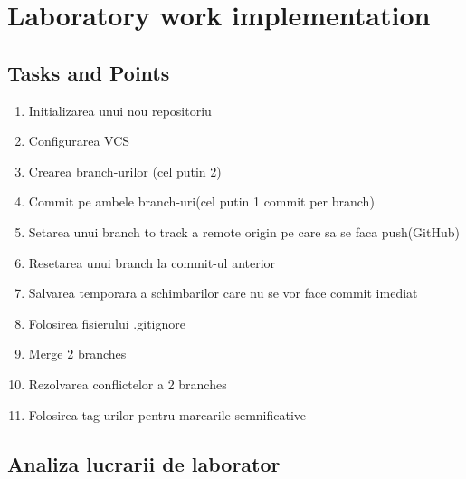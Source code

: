 \section{Laboratory work implementation}

\subsection{Tasks and Points}

\begin{enumerate}

	\item  Initializarea unui nou repositoriu
	\item  Configurarea VCS
	\item  Crearea branch-urilor (cel putin 2)
	\item  Commit pe ambele branch-uri(cel putin 1 commit per branch)
	\item  Setarea unui branch to track a remote origin pe care sa se faca push(GitHub)
	\item  Resetarea unui branch la commit-ul anterior
	\item  Salvarea temporara a schimbarilor care nu se vor face commit imediat
	\item  Folosirea fisierului .gitignore
	\item  Merge 2 branches
	\item  Rezolvarea conflictelor a 2 branches
	\item  Folosirea tag-urilor pentru marcarile semnificative
	
\end{enumerate}

\subsection{Analiza lucrarii de laborator}

